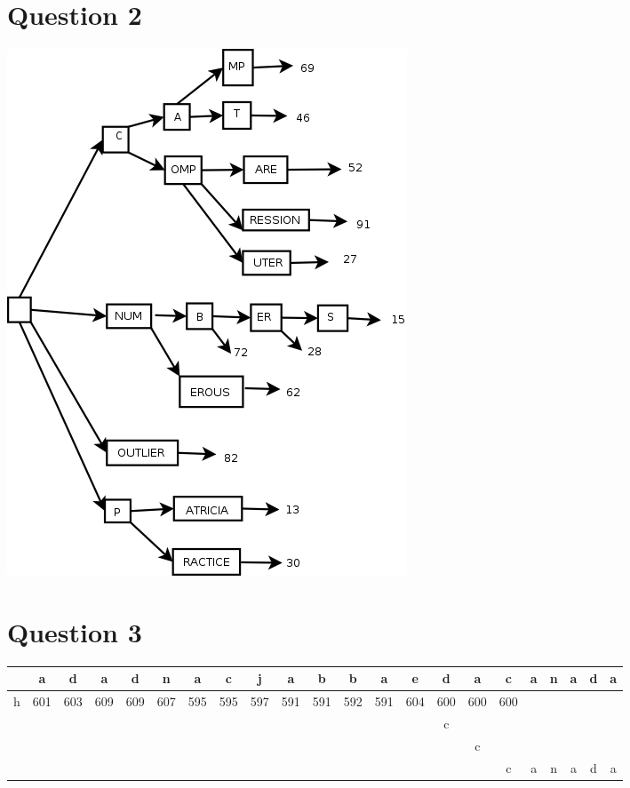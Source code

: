\documentclass{article}[12pt]
\begin{document}
\section*{Question 2}
\includegraphics[scale=0.45]{a5q2.png}

\section*{Question 3}
\begin{tabular}{|c|c|c|c|c|c|c|c|c|c|c|c|c|c|c|c|c|c|c|c|c|c|}
  \hline
  & a & d & a & d & n & a & c & j & a & b & b & a & e & d & a & c & a & n & a & d & a \\
  \hline
  h & 601 & 603 & 609 & 609 & 607 & 595 & 595 & 597 & 591 & 591 & 592 & 591 & 604 & 600 & 600 & 600 & & & & & \\
  \hline
  &  &  &  &  &  &  &  &  &  &  &  &  &  & c &  &  &  &  &  &  &  \\
  \hline
  &  &  &  &  &  &  &  &  &  &  &  &  &  &  & c &  &  &  &  &  &  \\
  \hline
  &  &  &  &  &  &  &  &  &  &  &  &  &  &  &  & c & a & n & a & d & a \\
  \hline
\end{tabular}
\end{document}
